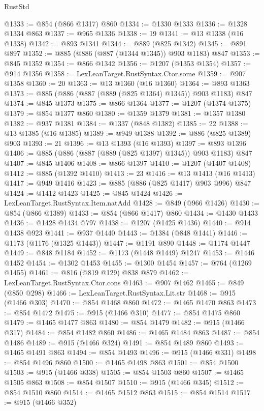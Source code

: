 \begin{lexlean}{RustStd}
\begin{coremodule}
@1333 := @854 (@866 @1317) @860
@1334 := @1330 @1333
@1336 := @1328 @1334 @863
@1337 := @965 @1336
@1338 := 19
@1341 := @13 @1338 (@16 @1338)
@1342 := @893 @1341
@1344 := @889 (@825 @1342)
@1345 := @891 @897
@1352 := @885 (@886 (@887 (@1344 @1345)) @903 @1183) @847
@1353 := @845 @1352
@1354 := @866 @1342
@1356 := @1207 (@1353 @1354)
@1357 := @914 @1356
@1358 := LexLeanTarget.RustSyntax.Ctor.some
@1359 := @907 @1358
@1360 := 20
@1363 := @13 @1360 (@16 @1360)
@1364 := @893 @1363
@1373 := @885 (@886 (@887 (@889 (@825 @1364) @1345)) @903 @1183) @847
@1374 := @845 @1373
@1375 := @866 @1364
@1377 := @1207 (@1374 @1375)
@1379 := @854 @1377 @860
@1380 := @1359 @1379
@1381 := @1357 @1380
@1382 := @937 @1381
@1384 := @1337 (@848 @1382)
@1385 := 22
@1388 := @13 @1385 (@16 @1385)
@1389 := @949 @1388
@1392 := @886 (@825 @1389) @903
@1393 := 21
@1396 := @13 @1393 (@16 @1393)
@1397 := @893 @1396
@1406 := @885 (@886 (@887 (@889 (@825 @1397) @1345)) @903 @1183) @847
@1407 := @845 @1406
@1408 := @866 @1397
@1410 := @1207 (@1407 @1408)
@1412 := @885 (@1392 @1410)
@1413 := 23
@1416 := @13 @1413 (@16 @1413)
@1417 := @949 @1416
@1423 := @885 (@886 (@825 @1417) @903 @996) @847
@1424 := @1412 @1423
@1425 := @845 @1424
@1426 := LexLeanTarget.RustSyntax.Item.natAdd
@1428 := @849 (@966 @1426)
@1430 := @854 (@866 @1389)
@1433 := @854 (@866 @1417) @860
@1434 := @1430 @1433
@1436 := @1428 @1434 @797
@1438 := @1207 (@1425 @1436)
@1440 := @914 @1438 @923
@1441 := @937 @1440
@1443 := @1384 (@848 @1441)
@1446 := @1173 (@1176 (@1325 @1443))
@1447 := @1191 @890
@1448 := @1174 @1447
@1449 := @848 @1184
@1452 := @1173 (@1448 @1449) @1247
@1453 := @1446 @1452
@1454 := @1302 @1453
@1455 := @1300 @1454
@1457 := @764 (@1269 @1455)
@1461 := @816 (@819 @129) @838 @879
@1462 := LexLeanTarget.RustSyntax.Ctor.cons
@1463 := @907 @1462
@1465 := @849 (@850 @298)
@1466 := LexLeanTarget.RustSyntax.Lit.str
@1468 := @915 (@1466 @303)
@1470 := @854 @1468 @860
@1472 := @1465 @1470 @863
@1473 := @854 @1472
@1475 := @915 (@1466 @310)
@1477 := @854 @1475 @860
@1479 := @1465 @1477 @863
@1480 := @854 @1479
@1482 := @915 (@1466 @317)
@1484 := @854 @1482 @860
@1486 := @1465 @1484 @863
@1487 := @854 @1486
@1489 := @915 (@1466 @324)
@1491 := @854 @1489 @860
@1493 := @1465 @1491 @863
@1494 := @854 @1493
@1496 := @915 (@1466 @331)
@1498 := @854 @1496 @860
@1500 := @1465 @1498 @863
@1501 := @854 @1500
@1503 := @915 (@1466 @338)
@1505 := @854 @1503 @860
@1507 := @1465 @1505 @863
@1508 := @854 @1507
@1510 := @915 (@1466 @345)
@1512 := @854 @1510 @860
@1514 := @1465 @1512 @863
@1515 := @854 @1514
@1517 := @915 (@1466 @352)

\end{coremodule}
\end{lexlean}
